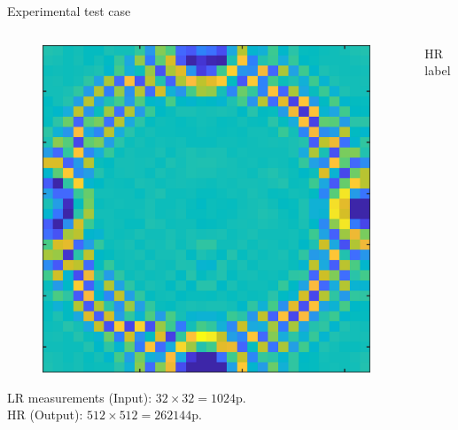 \documentclass[10pt,aspectratio=169,dvipsnames]{beamer} %
\begin{document}
\begin{frame}{Experimental test case}		
	\begin{columns}[T]
		\begin{column}[t]{0.25\textwidth}				
			\begin{figure}	
				\centering					
				\includegraphics[width=1\textwidth]{frame110_32x32.png}
			\end{figure}
			\footnotesize
			LR measurements (Input): \(32\times32=1024\)p. \\
			HR (Output): \(512\times512=262144\)p.
		\end{column}
		\begin{column}[t]{.25\textwidth}
			\begin{block}{HR label}
				\begin{figure}
					\centering

\end{figure}
\end{block}
\end{column}
\end{columns}
\end{frame}
\end{document}
